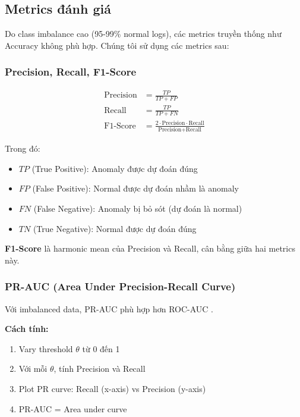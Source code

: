 \subsection{Metrics đánh giá}
\label{subsec:evaluation-metrics}

Do class imbalance cao (95-99\% normal logs), các metrics truyền thống như Accuracy không phù hợp. Chúng tôi sử dụng các metrics sau:

\subsubsection{Precision, Recall, F1-Score}

\begin{align}
\text{Precision} &= \frac{TP}{TP + FP} \label{eq:precision} \\
\text{Recall} &= \frac{TP}{TP + FN} \label{eq:recall} \\
\text{F1-Score} &= \frac{2 \cdot \text{Precision} \cdot \text{Recall}}{\text{Precision} + \text{Recall}} \label{eq:f1}
\end{align}

Trong đó:
\begin{itemize}
    \item $TP$ (True Positive): Anomaly được dự đoán đúng
    \item $FP$ (False Positive): Normal được dự đoán nhầm là anomaly
    \item $FN$ (False Negative): Anomaly bị bỏ sót (dự đoán là normal)
    \item $TN$ (True Negative): Normal được dự đoán đúng
\end{itemize}

\textbf{F1-Score} là harmonic mean của Precision và Recall, cân bằng giữa hai metrics này.

\subsubsection{PR-AUC (Area Under Precision-Recall Curve)}

Với imbalanced data, PR-AUC phù hợp hơn ROC-AUC \cite{saito2015precision}.

\textbf{Cách tính:}
\begin{enumerate}
    \item Vary threshold $\theta$ từ 0 đến 1
    \item Với mỗi $\theta$, tính Precision và Recall
    \item Plot PR curve: Recall (x-axis) vs Precision (y-axis)
    \item PR-AUC = Area under curve
\end{enumerate}

